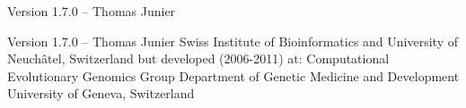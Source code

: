 
\setuppagenumbering[state=stop]

\blank[back]

\startalignment[center]
Version 1.7.0 -- \currentdate \crlf
\blank[2*big]
\blank[2*big]
Thomas Junier  
\stopalignment

\page

\blank[back]

\startalignment[center]
Version 1.7.0 -- \currentdate \crlf
\blank[]
Thomas Junier  \crlf
\blank[]
Swiss Institute of Bioinformatics \crlf
and \crlf
University of Neuch\^{a}tel, Switzerland \crlf
but developed (2006-2011) at: \crlf
Computational Evolutionary Genomics Group \crlf
Department of Genetic Medicine and Development \crlf
University of Geneva, Switzerland \crlf
\blank[]
\stopalignment
